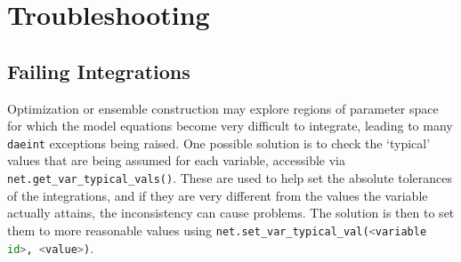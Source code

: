 \documentclass[12pt]{article}
\makeatletter
\newcommand{\py}[1]{\lstinline[language=Python, showstringspaces=False]@#1@}
\makeatother
\begin{document}
\section{Troubleshooting}
\subsection{Failing Integrations}
Optimization or ensemble construction may explore regions of parameter space for which the model equations become very difficult to integrate, leading to many \py{daeint} exceptions being raised.
One possible solution is to check the `typical' values that are being assumed for each variable, accessible via \py{net.get_var_typical_vals()}.
These are used to help set the absolute tolerances of the integrations, and if they are very different from the values the variable actually attains, the inconsistency can cause problems.
The solution is then to set them to more reasonable values using \py{net.set_var_typical_val(<variable id>, <value>)}.



\end{document}
